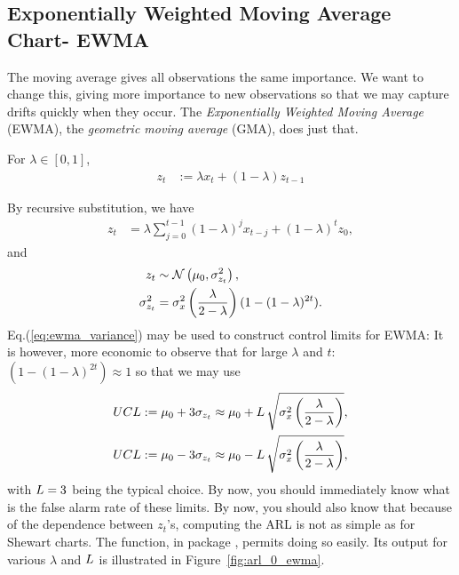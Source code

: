 \subsection[EWMA]{Exponentially Weighted Moving Average Chart- EWMA}
The moving average gives all observations the same importance. 
We want to change this, giving more importance to new observations so that we may capture drifts quickly when they occur. 
The \emph{Exponentially Weighted Moving Average} (EWMA), \aka the \emph{geometric moving average} (GMA), does just that. 
\begin{definition}
For $\lambda \in [0,1]$,
\begin{align}
	z_t &:= \lambda x_t + (1-\lambda) z_{t-1}
\end{align}
\end{definition}
By recursive substitution, we have 
\begin{align}
	z_t &= \lambda \sum_{j=0}^{t-1} (1-\lambda)^j x_{t-j} + (1-\lambda)^t z_0,
\end{align}
and 
\begin{align}
\label{eq:ewma_variance}
	z_t &\sim \mathcal{N}\left(\mu_0,	\sigma^2_{z_t} \right), \\
	\sigma^2_{z_t} &= \sigma^2_x \left( \frac{\lambda}{2-\lambda} \right)(1-(1-\lambda)^{2t}).
\end{align}
Eq.(\ref{eq:ewma_variance}) may be used to construct control limits for EWMA:
It is however, more economic to observe that for large $\lambda$ and $t$: $(1-(1-\lambda)^{2t}) \approx 1$ so that we may use 
\begin{align}
\begin{split}
\label{eq:ewma_variance_approximate}
	UCL &:= \mu_0 + 3 \sigma_{z_t} \approx \mu_0 + L \, \sqrt{\sigma^2_x\left( \frac{\lambda}{2-\lambda} \right)},  \\
	UCL &:= \mu_0 - 3 \sigma_{z_t} \approx \mu_0 - L \, \sqrt{\sigma^2_x\left( \frac{\lambda}{2-\lambda} \right)},
\end{split}
\end{align}
with $L=3$ being the typical choice.
By now, you should immediately know what is the false alarm rate of these limits.
By now, you should also know that because of the dependence between $z_t$'s, computing the ARL is not as simple as for Shewart charts. The  \R function, in package , permits doing so easily. 
Its output for various $\lambda$ and $L$ is illustrated in Figure~\ref{fig:arl_0_ewma}.

